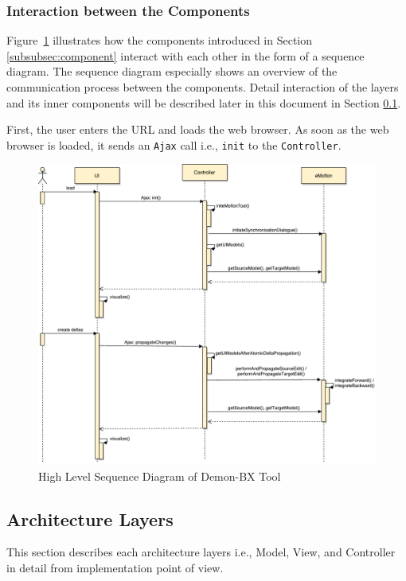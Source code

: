 \subsubsection{Interaction between the Components}\label{subsubsec:componentinteraction}
Figure~\ref{fig:Sequence_Diagram} illustrates how the components introduced in Section \ref{subsubsec:component} interact with each other in the form of a sequence diagram. The sequence diagram especially shows an overview of the communication process between the components. Detail interaction of the layers and its inner components will be described later in this document in Section \ref{subsec:imple_layers}.

First, the user enters the URL and loads the web browser. As soon as the web browser is loaded, it sends an \texttt{Ajax} call i.e., \texttt{init} to the \texttt{Controller}. 

\begin{figure}
	\includegraphics[width=1\textwidth]{figures/Sequence_Diagram}
	\caption{High Level Sequence Diagram of Demon-BX Tool}
	\label{fig:Sequence_Diagram}
\end{figure}

\subsection{Architecture Layers}\label{subsec:imple_layers}
This section describes each architecture layers i.e., Model, View, and Controller in detail from implementation point of view.

